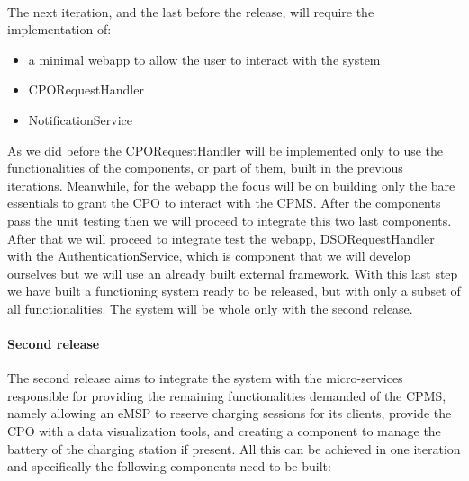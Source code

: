 \\
The next iteration, and the last before the release, will require the implementation of:
\begin{itemize}
    \item a minimal webapp to allow the user to interact with the system
    \item CPORequestHandler
    \item NotificationService
\end{itemize}
As we did before the CPORequestHandler will be implemented only to use the functionalities of the components, or part of them, built in the previous iterations. Meanwhile, for the webapp the focus will be on building only the bare essentials to grant the CPO to interact with the CPMS. After the components pass the unit testing then we will proceed to integrate this two last components. After that we will proceed to integrate test the webapp, DSORequestHandler with the AuthenticationService, which is component that we will develop ourselves but we will use an already built external framework. With this last step we have built a functioning system ready to be released, but with only a subset of all functionalities. The system will be whole only with the second release.

\paragraph{Second release}
The second release aims to integrate the system with the micro-services responsible for providing the remaining functionalities demanded of the CPMS, namely allowing an eMSP to reserve charging sessions for its clients, provide the CPO with a data visualization tools, and creating a component to manage the battery of the charging station if present. All this can be achieved in one iteration and specifically the following components need to be built:

